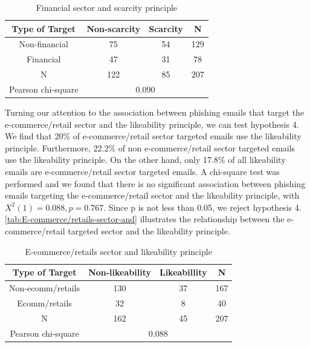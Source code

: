\begin{minipage}[t]{1\columnwidth}%
\begin{longtable}{cccc}
\caption{\label{tab:Financial-sector-and}Financial sector and scarcity principle}
\tabularnewline
\toprule 
{\footnotesize{}Type of Target} & {\footnotesize{}Non-scarcity} & {\footnotesize{}Scarcity} & \multirow{1}{*}{{\footnotesize{}N}}\tabularnewline
\midrule 
\multirow{1}{*}{{\footnotesize{}Non-financial}} & {\footnotesize{}75} & {\footnotesize{}54} & \multirow{1}{*}{{\footnotesize{}129}}\tabularnewline
\midrule 
\multirow{1}{*}{{\footnotesize{}Financial}} & {\footnotesize{}47} & {\footnotesize{}31} & \multirow{1}{*}{{\footnotesize{}78}}\tabularnewline
\midrule
\midrule 
{\footnotesize{}N} & {\footnotesize{}122} & {\footnotesize{}85} & {\footnotesize{}207}\tabularnewline
\midrule
\midrule 
{\footnotesize{}Pearson chi-square} & \multicolumn{3}{c}{{\footnotesize{}0.090}}\tabularnewline
\midrule
\end{longtable}%
\end{minipage}

Turning our attention to the association between phishing emails that
target the e-commerce/retail sector and the likeability principle,
we can test hypothesis 4. We find that 20\% of e-commerce/retail sector
targeted emails use the likeability principle. Furthermore, 22.2\%
of non e-commerce/retail sector targeted emails use the likeability
principle. On the other hand, only 17.8\% of all likeability emails
are e-commerce/retail sector targeted emails. A chi-square test was
performed and we found that there is no significant association between
phishing emails targeting the e-commerce/retail sector and the likeability
principle, with $X^{2}(1)=0.088,p=0.767$. Since p is not less than
0.05, we reject hypothesis 4. \autoref{tab:E-commerce/retails-sector-and}
illustrates the relationship between the e-commerce/retail targeted
sector and the likeability principle.

\begin{minipage}[t]{1\columnwidth}%
\begin{longtable}{cccc}
\caption{\label{tab:E-commerce/retails-sector-and}E-commerce/retails sector
and likeability principle}
\tabularnewline
\toprule 
{\footnotesize{}Type of Target} & {\footnotesize{}Non-likeability} & {\footnotesize{}Likeabillity} & \multirow{1}{*}{{\footnotesize{}N}}\tabularnewline
\midrule 
\multirow{1}{*}{{\footnotesize{}Non-ecomm/retails}} & {\footnotesize{}130} & {\footnotesize{}37} & \multirow{1}{*}{{\footnotesize{}167}}\tabularnewline
\midrule 
\multirow{1}{*}{{\footnotesize{}Ecomm/retails}} & {\footnotesize{}32} & {\footnotesize{}8} & \multirow{1}{*}{{\footnotesize{}40}}\tabularnewline
\midrule
\midrule 
{\footnotesize{}N} & {\footnotesize{}162} & {\footnotesize{}45} & {\footnotesize{}207}\tabularnewline
\midrule
\midrule 
{\footnotesize{}Pearson chi-square} & \multicolumn{3}{c}{{\footnotesize{}0.088}}\tabularnewline
\midrule
\end{longtable}%
\end{minipage}


